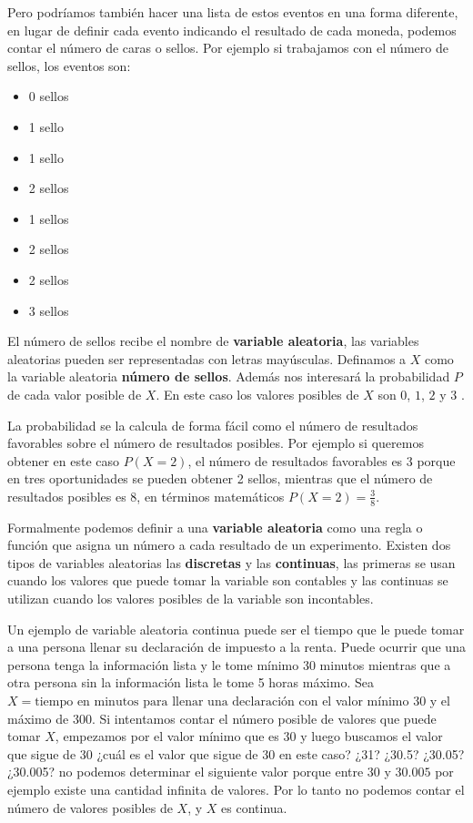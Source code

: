 \documentclass[letterpaper,]{book}
\providecommand{\tightlist}{%
  \setlength{\itemsep}{0pt}\setlength{\parskip}{0pt}}
\begin{document}
Pero podríamos también hacer una lista de estos eventos en una forma diferente, en lugar de definir cada evento indicando el resultado de cada moneda, podemos contar el número de caras o sellos. Por ejemplo si trabajamos con el número de sellos, los eventos son:

\begin{itemize}
\tightlist
\item
  0 sellos
\item
  1 sello
\item
  1 sello
\item
  2 sellos
\item
  1 sellos
\item
  2 sellos
\item
  2 sellos
\item
  3 sellos
\end{itemize}

El número de sellos recibe el nombre de \textbf{variable aleatoria}, las variables aleatorias pueden ser representadas con letras mayúsculas. Definamos a \(X\) como la variable aleatoria \textbf{número de sellos}. Además nos interesará la probabilidad \(P\) de cada valor posible de \(X\). En este caso los valores posibles de \(X\) son \(0\), \(1\), \(2\) y \(3\) \citep{uboe2017}.

La probabilidad se la calcula de forma fácil como el número de resultados favorables sobre el número de resultados posibles. Por ejemplo si queremos obtener en este caso \(P\left(X =2 \right)\), el número de resultados favorables es \(3\) porque en tres oportunidades se pueden obtener 2 sellos, mientras que el número de resultados posibles es 8, en términos matemáticos \(P\left(X=2\right)= \frac{3}{8}\).

Formalmente podemos definir a una \textbf{variable aleatoria} como una regla o función que asigna un número a cada resultado de un experimento. Existen dos tipos de variables aleatorias las \textbf{discretas} y las \textbf{continuas}, las primeras se usan cuando los valores que puede tomar la variable son contables y las continuas se utilizan cuando los valores posibles de la variable son incontables.

Un ejemplo de variable aleatoria continua puede ser el tiempo que le puede tomar a una persona llenar su declaración de impuesto a la renta. Puede ocurrir que una persona tenga la información lista y le tome mínimo 30 minutos mientras que a otra persona sin la información lista le tome 5 horas máximo. Sea \(X= \text{tiempo en minutos para llenar una declaración}\) con el valor mínimo 30 y el máximo de 300. Si intentamos contar el número posible de valores que puede tomar \(X\), empezamos por el valor mínimo que es \(30\) y luego buscamos el valor que sigue de \(30\) ¿cuál es el valor que sigue de 30 en este caso? ¿31? ¿30.5? ¿30.05? ¿30.005? no podemos determinar el siguiente valor porque entre \(30\) y \(30.005\) por ejemplo existe una cantidad infinita de valores. Por lo tanto no podemos contar el número de valores posibles de \(X\), y \(X\) es continua.
\end{document}
